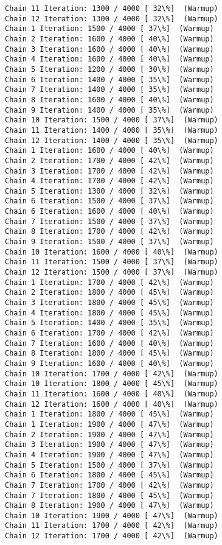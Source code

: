 \documentclass[11pt]{article}
\begin{document}
\begin{Verbatim}[commandchars=\\\{\}]
Chain 11 Iteration: 1300 / 4000 [ 32\%]  (Warmup)
Chain 12 Iteration: 1300 / 4000 [ 32\%]  (Warmup)
Chain 1 Iteration: 1500 / 4000 [ 37\%]  (Warmup)
Chain 2 Iteration: 1600 / 4000 [ 40\%]  (Warmup)
Chain 3 Iteration: 1600 / 4000 [ 40\%]  (Warmup)
Chain 4 Iteration: 1600 / 4000 [ 40\%]  (Warmup)
Chain 5 Iteration: 1200 / 4000 [ 30\%]  (Warmup)
Chain 6 Iteration: 1400 / 4000 [ 35\%]  (Warmup)
Chain 7 Iteration: 1400 / 4000 [ 35\%]  (Warmup)
Chain 8 Iteration: 1600 / 4000 [ 40\%]  (Warmup)
Chain 9 Iteration: 1400 / 4000 [ 35\%]  (Warmup)
Chain 10 Iteration: 1500 / 4000 [ 37\%]  (Warmup)
Chain 11 Iteration: 1400 / 4000 [ 35\%]  (Warmup)
Chain 12 Iteration: 1400 / 4000 [ 35\%]  (Warmup)
Chain 1 Iteration: 1600 / 4000 [ 40\%]  (Warmup)
Chain 2 Iteration: 1700 / 4000 [ 42\%]  (Warmup)
Chain 3 Iteration: 1700 / 4000 [ 42\%]  (Warmup)
Chain 4 Iteration: 1700 / 4000 [ 42\%]  (Warmup)
Chain 5 Iteration: 1300 / 4000 [ 32\%]  (Warmup)
Chain 6 Iteration: 1500 / 4000 [ 37\%]  (Warmup)
Chain 6 Iteration: 1600 / 4000 [ 40\%]  (Warmup)
Chain 7 Iteration: 1500 / 4000 [ 37\%]  (Warmup)
Chain 8 Iteration: 1700 / 4000 [ 42\%]  (Warmup)
Chain 9 Iteration: 1500 / 4000 [ 37\%]  (Warmup)
Chain 10 Iteration: 1600 / 4000 [ 40\%]  (Warmup)
Chain 11 Iteration: 1500 / 4000 [ 37\%]  (Warmup)
Chain 12 Iteration: 1500 / 4000 [ 37\%]  (Warmup)
Chain 1 Iteration: 1700 / 4000 [ 42\%]  (Warmup)
Chain 2 Iteration: 1800 / 4000 [ 45\%]  (Warmup)
Chain 3 Iteration: 1800 / 4000 [ 45\%]  (Warmup)
Chain 4 Iteration: 1800 / 4000 [ 45\%]  (Warmup)
Chain 5 Iteration: 1400 / 4000 [ 35\%]  (Warmup)
Chain 6 Iteration: 1700 / 4000 [ 42\%]  (Warmup)
Chain 7 Iteration: 1600 / 4000 [ 40\%]  (Warmup)
Chain 8 Iteration: 1800 / 4000 [ 45\%]  (Warmup)
Chain 9 Iteration: 1600 / 4000 [ 40\%]  (Warmup)
Chain 10 Iteration: 1700 / 4000 [ 42\%]  (Warmup)
Chain 10 Iteration: 1800 / 4000 [ 45\%]  (Warmup)
Chain 11 Iteration: 1600 / 4000 [ 40\%]  (Warmup)
Chain 12 Iteration: 1600 / 4000 [ 40\%]  (Warmup)
Chain 1 Iteration: 1800 / 4000 [ 45\%]  (Warmup)
Chain 1 Iteration: 1900 / 4000 [ 47\%]  (Warmup)
Chain 2 Iteration: 1900 / 4000 [ 47\%]  (Warmup)
Chain 3 Iteration: 1900 / 4000 [ 47\%]  (Warmup)
Chain 4 Iteration: 1900 / 4000 [ 47\%]  (Warmup)
Chain 5 Iteration: 1500 / 4000 [ 37\%]  (Warmup)
Chain 6 Iteration: 1800 / 4000 [ 45\%]  (Warmup)
Chain 7 Iteration: 1700 / 4000 [ 42\%]  (Warmup)
Chain 7 Iteration: 1800 / 4000 [ 45\%]  (Warmup)
Chain 8 Iteration: 1900 / 4000 [ 47\%]  (Warmup)
Chain 10 Iteration: 1900 / 4000 [ 47\%]  (Warmup)
Chain 11 Iteration: 1700 / 4000 [ 42\%]  (Warmup)
Chain 12 Iteration: 1700 / 4000 [ 42\%]  (Warmup)

\end{Verbatim}
\end{document}
